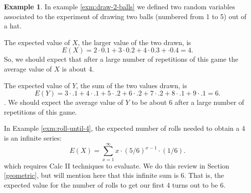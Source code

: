 \documentclass[
]{book}
\theoremstyle{definition}
\theoremstyle{definition}
\newtheorem{example}{Example}[chapter]
\theoremstyle{definition}
\theoremstyle{definition}
\theoremstyle{remark}
\begin{document}
\begin{example}
\protect\hypertarget{exm:first-EV}{}\label{exm:first-EV}In example \ref{exm:draw-2-balls} we defined two random variables associated to the experiment of drawing two balls (numbered from 1 to 5) out of a hat.

The expected value of \(X\), the larger value of the two drawn, is \[E(X) = 2 \cdot 0.1 + 3 \cdot 0.2 + 4 \cdot 0.3 + \cdot 0.4 = 4.\] So, we should expect that after a large number of repetitions of this game the average value of \(X\) is about 4.

The expected value of \(Y\), the sum of the two values drawn, is \[E(Y) = 3 \cdot .1 + 4 \cdot .1 + 5 \cdot .2 + 6 \cdot .2 + 7 \cdot .2 + 8 \cdot .1 + 9 \cdot .1 = 6.\]. We should expect the average value of \(Y\) to be about 6 after a large number of repetitions of this game.

In Example \ref{exm:roll-until-4}, the expected number of rolls needed to obtain a 4 is an infinite series:
\[E(X) = \sum_{x = 1}^\infty x \cdot (5/6)^{x-1} \cdot (1/6).\]
which requires Calc II techniques to evaluate. We do this review in Section \ref{geometric}, but will mention here that this infinite sum is 6. That is, the expected value for the number of rolls to get our first 4 turns out to be 6.
\end{example}
\end{document}
